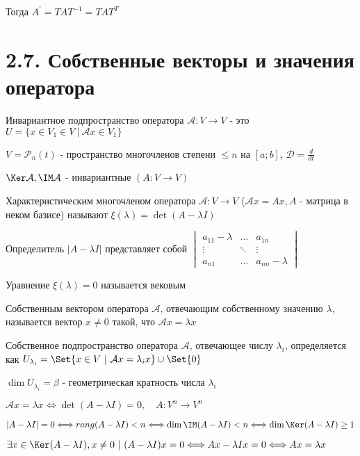 \documentclass[12pt]{article}
\begin{document}
    \Nota Тогда $A^\prime = T A T^{-1} = T A T^T$


    \section[p2\_7]{2.7. Собственные векторы и значения оператора}

    \Def Инвариантное подпространство оператора $\mathcal{A} : V \rightarrow V$ -
    это $U = \{x \in V_1 \in V \ | \ \mathcal{A}x \in V_1\}$

    \Ex $V = \mathcal{P}_n(t)$ - пространство многочленов степени $\leq n$ на $[a; b]$, $\mathcal{D} = \frac{d}{dt}$

    \Nota $\Ker \mathcal{A}, \IM \mathcal{A}$ - инвариантные $(A : V \rightarrow V)$

    \hypertarget{eigenvalue}{}

    \Def Характеристическим многочленом оператора $\mathcal{A} : V \rightarrow V$
    ($\mathcal{A}x = Ax, A$ - матрица в неком базисе) называют $\xi(\lambda) = \det(A - \lambda I)$

    \Nota Определитель $|A - \lambda I|$ представляет собой $\begin{vmatrix}a_{11} - \lambda & \dots & a_{1n} \\ \vdots & \ddots & \vdots \\ a_{n1} & \dots & a_{nn} - \lambda \end{vmatrix}$

    \Nota Уравнение $\xi(\lambda) = 0$ называется вековым

    \hypertarget{eigenvector}{}

    \Def Собственным вектором оператора $\mathcal{A}$, отвечающим собственному значению $\lambda$,
    называется вектор $x \neq 0$ такой, что $\mathcal{A}x = \lambda x$

    \Defs Собственное подпространство оператора $\mathcal{A}$, отвечающее числу $\lambda_i$, определяется как $U_{\lambda_i} = \Set{x \in V \ | \ \mathcal{A}x = \lambda_i x} \union \Set{0}$

    \Defs $\dim U_{\lambda_i} = \beta$ - геометрическая кратность числа $\lambda_i$

    \begin{MyTheorem}
        \Ths $\mathcal{A}x = \lambda x \Longleftrightarrow \det(A - \lambda I) = 0, \quad A : V^n \rightarrow V^n$
    \end{MyTheorem}

    \begin{MyProof}
        $|A - \lambda I| = 0 \Longleftrightarrow rang (A - \lambda I) < n \Longleftrightarrow
        \dim \IM (A - \lambda I) < n \Longleftrightarrow \dim \Ker (A - \lambda I) \geq 1$

        $\exists x \in \Ker (A - \lambda I), x \neq 0 \ | \ (A - \lambda I) x = 0 \Longleftrightarrow Ax - \lambda I x = 0 \Longleftrightarrow Ax = \lambda x$
    \end{MyProof}
\end{document}
